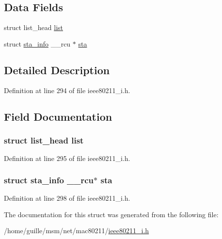 \subsection*{Data Fields}
\begin{DoxyCompactItemize}
\item 
struct list\-\_\-head \hyperlink{structieee80211__if__vlan_a1f00f18b91d5a820f2c43064243aa86e}{list}
\item 
struct \hyperlink{structsta__info}{sta\-\_\-info} \-\_\-\-\_\-rcu $\ast$ \hyperlink{structieee80211__if__vlan_a7e16457ec9b4b8bc5946669eb4b3c954}{sta}
\end{DoxyCompactItemize}


\subsection{Detailed Description}


Definition at line 294 of file ieee80211\-\_\-i.\-h.



\subsection{Field Documentation}
\hypertarget{structieee80211__if__vlan_a1f00f18b91d5a820f2c43064243aa86e}{
\subsubsection[{list}]{\setlength{\rightskip}{0pt plus 5cm}struct list\-\_\-head list}}\label{structieee80211__if__vlan_a1f00f18b91d5a820f2c43064243aa86e}


Definition at line 295 of file ieee80211\-\_\-i.\-h.

\hypertarget{structieee80211__if__vlan_a7e16457ec9b4b8bc5946669eb4b3c954}{
\subsubsection[{sta}]{\setlength{\rightskip}{0pt plus 5cm}struct {\bf sta\-\_\-info} \-\_\-\-\_\-rcu$\ast$ sta}}\label{structieee80211__if__vlan_a7e16457ec9b4b8bc5946669eb4b3c954}


Definition at line 298 of file ieee80211\-\_\-i.\-h.



The documentation for this struct was generated from the following file\-:\begin{DoxyCompactItemize}
\item 
/home/guille/msm/net/mac80211/\hyperlink{ieee80211__i_8h}{ieee80211\-\_\-i.\-h}\end{DoxyCompactItemize}
